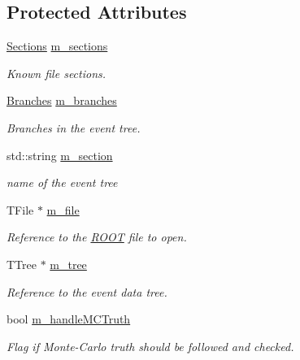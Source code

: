 \subsection*{Protected Attributes}
\begin{DoxyCompactItemize}
\item 
\hyperlink{class_d_d4hep_1_1_simulation_1_1_geant4_output2_r_o_o_t_a6bee4e4ece80aae4e2e07295486f8cd0}{Sections} \hyperlink{class_d_d4hep_1_1_simulation_1_1_geant4_output2_r_o_o_t_a43291c7d4f16e1f7eda8da9a16d6c4fa}{m\_\-sections}
\begin{DoxyCompactList}\small\item\em Known file sections. \item\end{DoxyCompactList}\item 
\hyperlink{class_d_d4hep_1_1_simulation_1_1_geant4_output2_r_o_o_t_a7c5890a17d3f70ce65703cdbec3cf53c}{Branches} \hyperlink{class_d_d4hep_1_1_simulation_1_1_geant4_output2_r_o_o_t_aaa47a8c6bcede196e832490b3a7c90bd}{m\_\-branches}
\begin{DoxyCompactList}\small\item\em Branches in the event tree. \item\end{DoxyCompactList}\item 
std::string \hyperlink{class_d_d4hep_1_1_simulation_1_1_geant4_output2_r_o_o_t_a27d44319d71af2cbb9304f94fce6a075}{m\_\-section}
\begin{DoxyCompactList}\small\item\em name of the event tree \item\end{DoxyCompactList}\item 
TFile $\ast$ \hyperlink{class_d_d4hep_1_1_simulation_1_1_geant4_output2_r_o_o_t_aaaa94e6e9906bc1853e149bc82cfb2af}{m\_\-file}
\begin{DoxyCompactList}\small\item\em Reference to the \hyperlink{namespace_r_o_o_t}{ROOT} file to open. \item\end{DoxyCompactList}\item 
TTree $\ast$ \hyperlink{class_d_d4hep_1_1_simulation_1_1_geant4_output2_r_o_o_t_abebdae30096c1b1a5ff1f7da427db295}{m\_\-tree}
\begin{DoxyCompactList}\small\item\em Reference to the event data tree. \item\end{DoxyCompactList}\item 
bool \hyperlink{class_d_d4hep_1_1_simulation_1_1_geant4_output2_r_o_o_t_a3c70e98cb0a96de60a51443482a88c9f}{m\_\-handleMCTruth}
\begin{DoxyCompactList}\small\item\em Flag if Monte-\/Carlo truth should be followed and checked. \item\end{DoxyCompactList}\end{DoxyCompactItemize}


